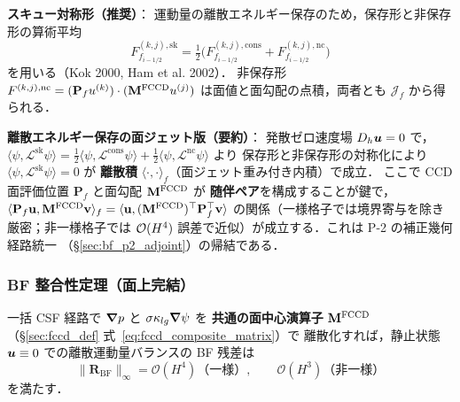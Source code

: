 \noindent\textbf{スキュー対称形（推奨）}：
運動量の離散エネルギー保存のため，保存形と非保存形の算術平均
\begin{equation}
  F^{(k,j),\text{sk}}_{f_{i-1/2}}
  = \tfrac{1}{2}\bigl(F^{(k,j),\text{cons}}_{f_{i-1/2}}
  + F^{(k,j),\text{nc}}_{f_{i-1/2}}\bigr)
  \label{eq:fccd_adv_flux_skew}
\end{equation}
を用いる（Kok 2000, Ham et al. 2002）．
非保存形 $F^{(k,j),\text{nc}} = (\mathbf{P}_f u^{(k)})\cdot(\mathbf{M}^{\mathrm{FCCD}}u^{(j)})$
は面値と面勾配の点積，両者とも $\mathcal{J}_f$ から得られる．

\smallskip\noindent\textbf{離散エネルギー保存の面ジェット版（要約）}：
発散ゼロ速度場 $D_h\bm{u}=0$ で，
$\langle\psi,\mathcal{L}^\text{sk}\psi\rangle = \tfrac{1}{2}\langle\psi,\mathcal{L}^\text{cons}\psi\rangle
+ \tfrac{1}{2}\langle\psi,\mathcal{L}^\text{nc}\psi\rangle$ より
保存形と非保存形の対称化により $\langle\psi,\mathcal{L}^\text{sk}\psi\rangle=0$
が \textbf{離散積} $\langle\cdot,\cdot\rangle_{f}$（面ジェット重み付き内積）で成立．
ここで CCD 面評価位置 $\mathbf{P}_f$ と面勾配 $\mathbf{M}^{\mathrm{FCCD}}$ が
\textbf{随伴ペア}を構成することが鍵で，
$\langle\mathbf{P}_f\mathbf{u},\mathbf{M}^{\mathrm{FCCD}}\mathbf{v}\rangle_f
=\langle\mathbf{u},(\mathbf{M}^{\mathrm{FCCD}})^\top\mathbf{P}_f^\top\mathbf{v}\rangle$
の関係（一様格子では境界寄与を除き厳密；非一様格子では $\mathcal{O}(H^4)$
誤差で近似）が成立する．これは P-2 の補正幾何経路統一
（§\ref{sec:bf_p2_adjoint}）の帰結である．

\subsubsection{BF 整合性定理（面上完結）}
\label{sec:fccd_adv_bf_theorem}

\begin{theorem}\label{thm:fccd_adv_bf}
一括 CSF 経路で $\bm{\nabla} p$ と $\sigma\kappa_{lg}\bm{\nabla}\psi$ を
\textbf{共通の面中心演算子}
$\mathbf{M}^{\mathrm{FCCD}}$（\S\ref{sec:fccd_def} 式~\eqref{eq:fccd_composite_matrix}）で
離散化すれば，静止状態 $\bm{u}\equiv 0$ での離散運動量バランスの
BF 残差は
\begin{equation*}
  \|\mathbf{R}_\text{BF}\|_\infty = \mathcal{O}(H^4)\text{（一様）},
  \qquad \mathcal{O}(H^3)\text{（非一様）}
\end{equation*}
を満たす．
\end{theorem}

